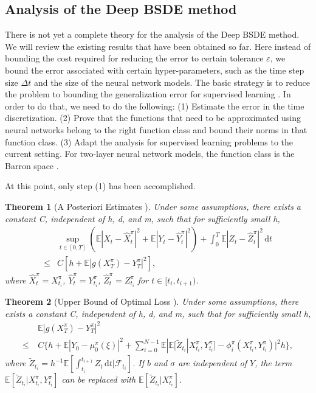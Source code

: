 \documentclass[12pt,AutoFakeBold,AutoFakeSlant]{article}
\newtheorem{theorem}{Theorem}
\theoremstyle{definition}
\newcommand{\E}{\mathbb{E}}
\newcommand{\eps}{\varepsilon}
\newcommand{\rmd}{\mathrm{d}}
\begin{document}
	\subsection{Analysis of the Deep BSDE method}
	There is not yet a complete theory for the analysis of the Deep BSDE method.  We will review the existing results
	that have been obtained so far.
	Here instead of bounding the cost required  for reducing the error to certain tolerance $\eps$, we bound the error 
	associated with certain hyper-parameters, such as the time step size $\Delta t$ and the size of the neural network models.
	The basic strategy is to reduce the problem to bounding the generalization error for supervised learning
	\cite{EMaWu2019machine}. In order to do that, we need to do the following: (1) Estimate the error in the time discretization. 
	(2) Prove that the functions that need to be approximated using neural networks belong to the right function class
	and bound their norms in that function class.  (3) Adapt the analysis for supervised learning problems to the current setting.
	For two-layer neural network models, the function class is the Barron space \cite{EMaWu2019barron}.

	At this point, only step (1) has been accomplished.

	\begin{theorem}[A Posteriori Estimates \cite{Han2018convergence}]
	Under some assumptions, there exists a constant C, independent of h, d, and m, such that for sufficiently small h,
	\begin{equation}
	\begin{aligned}
		&\sup_{ t \in [0,T]} (\E|X_t - \hat{X}_t^{\pi}|^2 + \E|Y_t - \hat{Y}_t^{\pi}|^2) + \int_{0 }^{T} \E|Z_t - \hat{Z}_t^\pi|^2 \, \mathrm{d}t \\ 
		\le &C[h +  \E|g(X_{T}^\pi) - Y_T^{\pi}|^2],
		\end{aligned}
		\end{equation}
	where $\hat{X}_t^{\pi} = X_{t_i}^\pi$, $\hat{Y}_t^{\pi} = Y_{t_i}^\pi$, $\hat{Z}_t^{\pi} = Z_{t_i}^\pi$ for $t \in [t_i,t_{i+1})$.
	\end{theorem}

	\begin{theorem}[Upper Bound of Optimal Loss \cite{Han2018convergence}]
	Under some assumptions, there exists a constant C, independent of h, d, and m, such that for sufficiently small h,
	\begin{equation}
	\begin{aligned}
		&\E|g(X_T^\pi) - Y_T^{\pi}|^2 \\
		\le~& C\Big\{h +  \E|Y_0 - \mu_0^\pi(\xi)|^2 + \sum_{i = 0}^{N-1}\E|\E[\tilde{Z}_{t_i}|X_{t_i}^\pi,Y_{t_i}^\pi] - \phi_i^\pi(X_{t_i}^\pi,Y_{t_i}^\pi)|^2h \Big\},
	\end{aligned}
	\end{equation}
	where $\tilde{Z}_{t_i} =h^{-1}\E[\int_{t_i}^{t_{i+1}}Z_t\,\rmd t|\mathcal{F}_{t_i}]$. If $b$ and $\sigma$ are independent of $Y$, the term $\E[\tilde{Z}_{t_i}|X_{t_i}^\pi,Y_{t_i}^\pi]$ can be replaced with $\E[\tilde{Z}_{t_i}|X_{t_i}^\pi]$. 
	\end{theorem}
\end{document}
